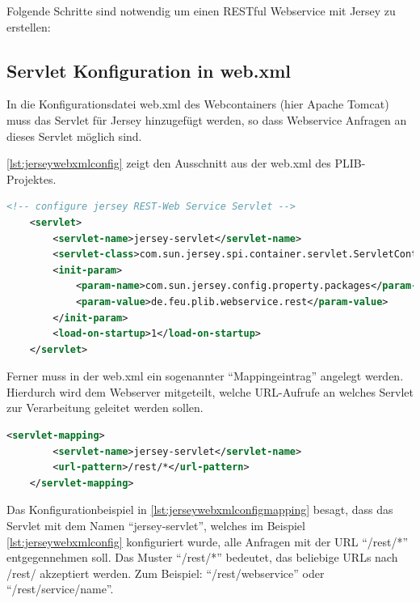 Folgende Schritte sind notwendig um einen \gls{REST}ful Webservice mit Jersey zu erstellen: 

\subsection{Servlet Konfiguration in web.xml} 

In die Konfigurationsdatei web.xml des Webcontainers (hier \gls{Apache Tomcat}) muss das Servlet für \gls{Jersey} hinzugefügt werden, so dass \gls{Webservice} Anfragen an dieses Servlet möglich sind. 

\autoref{lst:jerseywebxmlconfig} zeigt den Ausschnitt aus der web.xml des \gls{PLIB}-Projektes. 

 \begin{lstlisting}[caption=Jersey Servlet Konfiguration in web.xml, language=XML, label=lst:jerseywebxmlconfig]
 <!-- configure jersey REST-Web Service Servlet -->
    <servlet>
        <servlet-name>jersey-servlet</servlet-name>
        <servlet-class>com.sun.jersey.spi.container.servlet.ServletContainer</servlet-class>
        <init-param>
            <param-name>com.sun.jersey.config.property.packages</param-name>
            <param-value>de.feu.plib.webservice.rest</param-value>
        </init-param>
        <load-on-startup>1</load-on-startup>
    </servlet>
 \end{lstlisting}   
 
Ferner muss in der web.xml ein sogenannter \enquote{Mappingeintrag} angelegt werden. Hierdurch wird dem Webserver mitgeteilt, welche \gls{URL}-Aufrufe an welches \gls{Servlet} zur Verarbeitung geleitet werden sollen. 
 
  \begin{lstlisting}[caption=Jersey Servlet Mappingkonfiguration in web.xml, language=XML, label=lst:jerseywebxmlconfigmapping]
    <servlet-mapping>
        <servlet-name>jersey-servlet</servlet-name>
        <url-pattern>/rest/*</url-pattern>
    </servlet-mapping>
 \end{lstlisting}  
 
Das Konfigurationbeispiel in \autoref{lst:jerseywebxmlconfigmapping}  besagt, dass das \gls{Servlet} mit dem Namen \enquote{jersey-servlet}, welches im Beispiel \autoref{lst:jerseywebxmlconfig}  konfiguriert wurde, alle Anfragen mit der URL \enquote{/rest/*} entgegennehmen soll. Das Muster \enquote{/rest/*} bedeutet, das beliebige URLs nach /rest/ akzeptiert werden. Zum Beispiel: \enquote{/rest/webservice} oder \enquote{/rest/service/name}.


